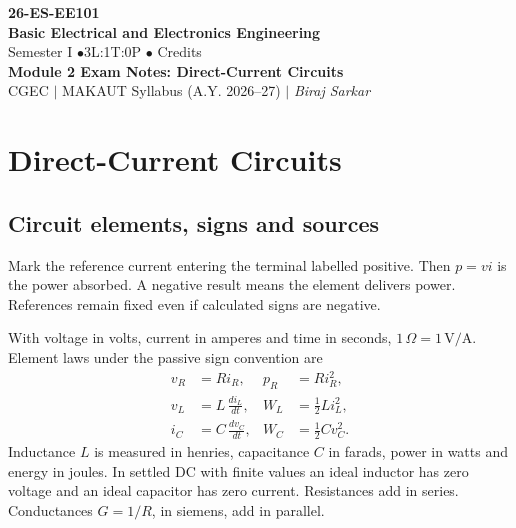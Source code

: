 \documentclass[12pt,a4paper]{article}
\begin{document}
\begin{center}
  {\Large\bfseries\color{myred} 26-ES-EE101}\\[3pt]
  {\LARGE\bfseries\color{myred} Basic Electrical and Electronics Engineering}\\[5pt]
  {\normalsize\color{mydark} Semester I \quad$\bullet$\quad 3L:1T:0P \quad$\bullet$ Credits}\\[3pt]
  {\normalsize\color{myteal}\textbf{Module 2 Exam Notes: Direct-Current Circuits}}\\[3pt]
  {\small\color{mydark} CGEC \;$|$\; MAKAUT Syllabus (A.Y. 2026--27) \;$|$\; \textit{Biraj Sarkar}}
\end{center}
\vspace{2pt}
\noindent{\color{myred}\rule{\linewidth}{1.5pt}}
\vspace{2pt}

\hypersetup{linkcolor=mydark}
\tableofcontents
\hypersetup{linkcolor=myteal}
\newpage

\section{Direct-Current Circuits}

\subsection{Circuit elements, signs and sources}
\begin{tcolorbox}[defbox,title={Passive sign convention}]
Mark the reference current entering the terminal labelled positive. Then \(p=vi\) is the power absorbed. A negative result means the element delivers power. References remain fixed even if calculated signs are negative.
\end{tcolorbox}

With voltage in volts, current in amperes and time in seconds, \(1\,\Omega=1\,\mathrm{V/A}\). Element laws under the passive sign convention are
\[
\begin{aligned}
v_R&=Ri_R, & p_R&=Ri_R^2,\\
v_L&=L\,\frac{di_L}{dt}, & W_L&=\frac12 Li_L^2,\\
i_C&=C\,\frac{dv_C}{dt}, & W_C&=\frac12 Cv_C^2 .
\end{aligned}
\]
Inductance \(L\) is measured in henries, capacitance \(C\) in farads, power in watts and energy in joules. In settled DC with finite values an ideal inductor has zero voltage and an ideal capacitor has zero current. Resistances add in series. Conductances \(G=1/R\), in siemens, add in parallel.
\end{document}
